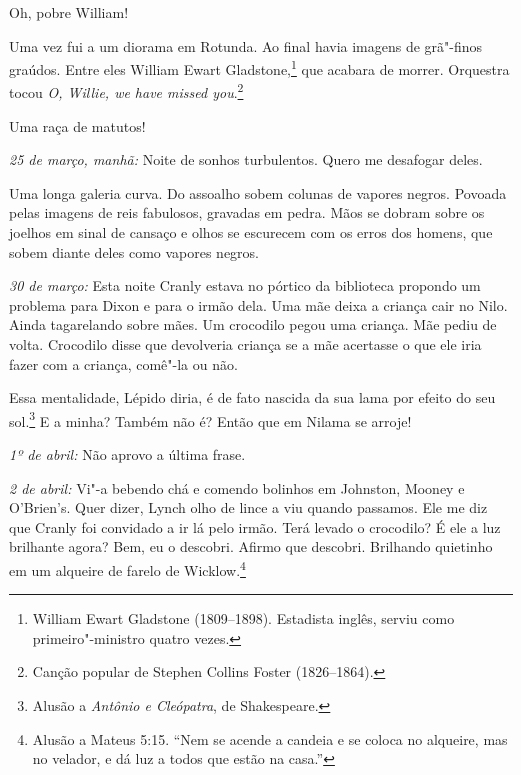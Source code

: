 Oh, pobre William!

Uma vez fui a um diorama em Rotunda. Ao final havia imagens de
grã"-finos graúdos. Entre eles William Ewart Gladstone,\footnote{ William
Ewart Gladstone (1809--1898). Estadista inglês, serviu como primeiro"-ministro quatro vezes.} que acabara de morrer. Orquestra tocou
\textit{O, Willie, we have missed you}.\footnote{ Canção popular de Stephen Collins Foster (1826--1864).}

Uma raça de matutos!

\medskip\noindent\textit{25 de março, manhã:} Noite de sonhos turbulentos. Quero me
desafogar deles.

Uma longa galeria curva. Do assoalho sobem colunas de vapores negros.
Povoada pelas imagens de reis fabulosos, gravadas em pedra. Mãos se
dobram sobre os joelhos em sinal de cansaço e olhos se escurecem com os
erros dos homens, que sobem diante deles como vapores negros.


\medskip\noindent\textit{30 de março:} Esta noite Cranly estava no pórtico da biblioteca
propondo um problema para Dixon e para o irmão dela. Uma mãe deixa a
criança cair no Nilo. Ainda tagarelando sobre mães. Um crocodilo pegou
uma criança. Mãe pediu de volta. Crocodilo disse que devolveria criança
se a mãe acertasse o que ele iria fazer com a criança, comê"-la ou não.

Essa mentalidade, Lépido diria, é de fato nascida da sua lama por efeito
do seu sol.\footnote{ Alusão a  \textit{Antônio e Cleópatra}, de Shakespeare.} 
E a minha? Também não é? Então que em Nilama se arroje!   

\medskip\noindent\textit{1º de abril:} Não aprovo a última frase.

\medskip\noindent\textit{2 de abril:} Vi"-a bebendo chá e comendo bolinhos em Johnston,
Mooney e O’Brien’s. Quer dizer, Lynch
olho de lince a viu quando passamos. Ele me diz que Cranly foi
convidado a ir lá pelo irmão. Terá levado o crocodilo? É ele a luz
brilhante agora? Bem, eu o descobri. Afirmo que descobri. Brilhando
quietinho em um alqueire de farelo de Wicklow.\footnote{ Alusão a Mateus 5:15.
“Nem se acende a candeia e se coloca no alqueire, mas no velador, e dá
luz a todos que estão na casa.”}

